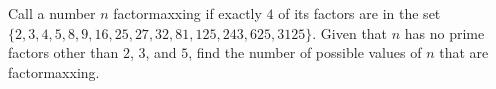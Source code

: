 Call a number $n$ factormaxxing if exactly $4$ of its factors are in the set $\{2,3,4,5,8,9,16,25,27,32,81,125,243,625,3125\}$. Given that $n$ has no prime factors other than $2$, $3$, and $5$, find the number of possible values of $n$ that are factormaxxing.
